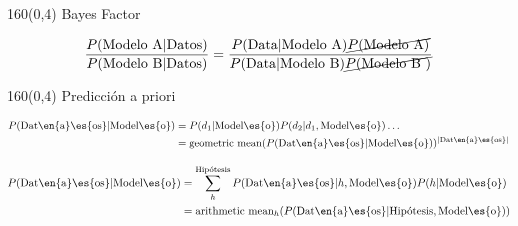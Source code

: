\documentclass[shownotes,aspectratio=169]{beamer}
\begin{document}
\begin{frame}[plain]
\begin{textblock}{160}(0,4)
\centering \LARGE Bayes Factor
\end{textblock}
\vspace{1cm}


 \begin{equation*}
\begin{split}
 \frac{P(\text{Modelo A}|\text{Datos})}{P(\text{Modelo B}|\text{Datos})} = \frac{P(\text{Data}|\text{Modelo A})\cancel{P(\text{Modelo A})}}{P(\text{Data}|\text{Modelo B})\cancel{P(\text{Modelo B })}}
\end{split}
\end{equation*}


\end{frame}

\begin{frame}[plain]
\begin{textblock}{160}(0,4)
\centering \LARGE Predicción a priori
\end{textblock}
\vspace{1cm}

 \begin{equation*}
\begin{split}
P(\text{Dat\en{a}\es{os}}|\text{Model\es{o}}) & = P(d_1|\text{Model\es{o}})P(d_2|d_1,\text{Model\es{o}}) \dots \\
& = \text{geometric mean}(P(\text{Dat\en{a}\es{os}}|\text{Model\es{o}}))^{|\text{Dat\en{a}\es{os}}|}
\end{split}
\end{equation*}

\vspace{0.4cm}
\pause

\begin{equation*}
\begin{split}
P(\text{Dat\en{a}\es{os}}|\text{Model\es{o}}) & = \sum^{\text{Hipótesis}}_h P(\text{Dat\en{a}\es{os}}|h,\text{Model\es{o}}) P(h|\text{Model\es{o}}) \\
& = \text{arithmetic mean}_h(P(\text{Dat\en{a}\es{os}}|\text{Hipótesis},\text{Model\es{o}}))
\end{split}
\end{equation*}

\end{frame}
\end{document}
